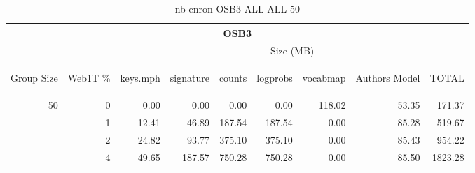 \begin{center}
\begin{table}[htbp]
\begin{tabular}{ | r | r | r | r | r | r | r | r | r |}
\hline
\multicolumn{9}{|c|}{OSB3}\\
\hline
 & & \multicolumn{7}{|c|}{Size (MB)}\\ \cline{3-9}
\begin{sideways}Group Size\end{sideways} & \begin{sideways}Web1T \% \end{sideways} & \begin{sideways}keys.mph\end{sideways} & \begin{sideways}signature\end{sideways} & \begin{sideways}counts\end{sideways} & \begin{sideways}logprobs\end{sideways} & \begin{sideways}vocabmap\end{sideways} & \begin{sideways}Authors Model \end{sideways} & \begin{sideways}TOTAL\end{sideways}\\
\hline
\multirow{3}{*}{50}
 & 0 & 0.00 & 0.00 & 0.00 & 0.00 & 118.02 & 53.35 & 171.37\\ \cline{2-9}
 & 1 & 12.41 & 46.89 & 187.54 & 187.54 & 0.00 & 85.28 & 519.67\\ \cline{2-9}
 & 2 & 24.82 & 93.77 & 375.10 & 375.10 & 0.00 & 85.43 & 954.22\\ \cline{2-9}
 & 4 & 49.65 & 187.57 & 750.28 & 750.28 & 0.00 & 85.50 & 1823.28\\ \cline{2-9}
\hline
\end{tabular}
\caption{nb-enron-OSB3-ALL-ALL-50}
\label{table:nb-enron-OSB3-ALL-ALL-50}
\end{table}
\end{center}

